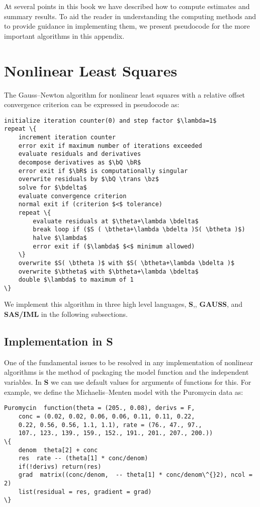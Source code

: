 
At several points in this book we have described how to compute
estimates and summary results.  To aid the reader in understanding the
computing methods and to provide guidance in implementing them, we
present pseudocode for the more important algorithms in this appendix.
\section{Nonlinear Least Squares}

The Gauss--Newton algorithm for nonlinear least squares with a
relative offset convergence criterion can be expressed in pseudocode
as:
\begin{verbatim}
initialize iteration counter(0) and step factor $\lambda=1$
repeat \{
    increment iteration counter
    error exit if maximum number of iterations exceeded
    evaluate residuals and derivatives
    decompose derivatives as $\bQ \bR$
    error exit if $\bR$ is computationally singular
    overwrite residuals by $\bQ \trans \bz$
    solve for $\bdelta$
    evaluate convergence criterion
    normal exit if (criterion $<$ tolerance)
    repeat \{
        evaluate residuals at $\theta+\lambda \bdelta$
        break loop if ($S ( \btheta+\lambda \bdelta )S( \btheta )$)
        halve $\lambda$
        error exit if ($\lambda$ $<$ minimum allowed)
    \}
    overwrite $S( \btheta )$ with $S( \btheta+\lambda \bdelta )$
    overwrite $\btheta$ with $\btheta+\lambda \bdelta$
    double $\lambda$ to maximum of 1
\}
\end{verbatim}
We implement this algorithm in three high level languages, {\bf
S},\cite{beck:cham:wilk:1988},
{\bf GAUSS}\cite{edle:jone:1986},
and {\bf SAS/IML}\cite{SAS:1985:iml} in the following subsections.

\subsection{Implementation in {\bf S}}

One of the fundamental issues to be resolved in any implementation of
nonlinear algorithms is the method of packaging the model function and
the independent variables.  In {\bf S} we can use default
values for arguments of functions for this.  For example, we define
the Michaelis--Menten model with the Puromycin data as:
\begin{verbatim}
Puromycin  function(theta = (205., 0.08), derivs = F,
    conc = (0.02, 0.02, 0.06, 0.06, 0.11, 0.11, 0.22,
    0.22, 0.56, 0.56, 1.1, 1.1), rate = (76., 47., 97.,
    107., 123., 139., 159., 152., 191., 201., 207., 200.))
\{
    denom  theta[2] + conc
    res  rate -- (theta[1] * conc/denom)
    if(!derivs) return(res)
    grad  matrix((conc/denom,  -- theta[1] * conc/denom\^{}2), ncol = 2)
    list(residual = res, gradient = grad)
\}
\end{verbatim}


